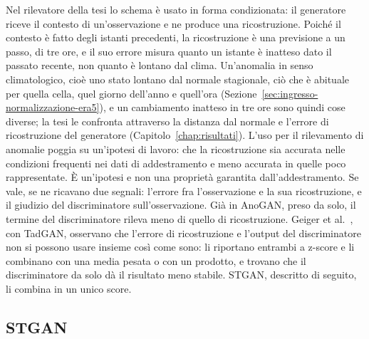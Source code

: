 Nel rilevatore della tesi lo schema è usato in forma condizionata: il generatore riceve il contesto di un'osservazione e ne produce una ricostruzione. Poiché il contesto è fatto degli istanti precedenti, la ricostruzione è una previsione a un passo, di tre ore, e il suo errore misura quanto un istante è inatteso dato il passato recente, non quanto è lontano dal clima. Un'anomalia in senso climatologico, cioè uno stato lontano dal normale stagionale, ciò che è abituale per quella cella, quel giorno dell'anno e quell'ora (Sezione~\ref{sec:ingresso-normalizzazione-era5}), e un cambiamento inatteso in tre ore sono quindi cose diverse; la tesi le confronta attraverso la distanza dal normale e l'errore di ricostruzione del generatore (Capitolo~\ref{chap:risultati}). L'uso per il rilevamento di anomalie poggia su un'ipotesi di lavoro: che la ricostruzione sia accurata nelle condizioni frequenti nei dati di addestramento e meno accurata in quelle poco rappresentate. È un'ipotesi e non una proprietà garantita dall'addestramento. Se vale, se ne ricavano due segnali: l'errore fra l'osservazione e la sua ricostruzione, e il giudizio del discriminatore sull'osservazione. Già in AnoGAN, preso da solo, il termine del discriminatore rileva meno di quello di ricostruzione. Geiger et al.~\cite{geiger2020tadgan}, con TadGAN, osservano che l'errore di ricostruzione e l'output del discriminatore non si possono usare insieme così come sono: li riportano entrambi a z-score e li combinano con una media pesata o con un prodotto, e trovano che il discriminatore da solo dà il risultato meno stabile.
STGAN, descritto di seguito, li combina in un unico score.

\subsection{STGAN}
\label{sec:rw-stgan}

